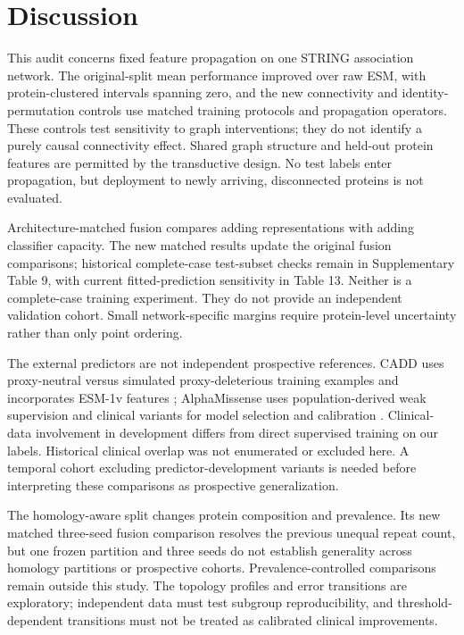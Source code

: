 \documentclass[conference]{IEEEtran}
\begin{document}
\section{Discussion}

This audit concerns fixed feature propagation on one STRING association network. The original-split mean performance improved over raw ESM, with protein-clustered intervals spanning zero, and the new connectivity and identity-permutation controls use matched training protocols and propagation operators. These controls test sensitivity to graph interventions; they do not identify a purely causal connectivity effect. Shared graph structure and held-out protein features are permitted by the transductive design. No test labels enter propagation, but deployment to newly arriving, disconnected proteins is not evaluated.

Architecture-matched fusion compares adding representations with adding classifier capacity. The new matched results update the original fusion comparisons; historical complete-case test-subset checks remain in Supplementary Table 9, with current fitted-prediction sensitivity in Table 13. Neither is a complete-case training experiment. They do not provide an independent validation cohort. Small network-specific margins require protein-level uncertainty rather than only point ordering.

The external predictors are not independent prospective references. CADD uses proxy-neutral versus simulated proxy-deleterious training examples and incorporates ESM-1v features \cite{Kircher2014CADD,Schubach2024CADDv17}; AlphaMissense uses population-derived weak supervision and clinical variants for model selection and calibration \cite{Cheng2023AlphaMissense}. Clinical-data involvement in development differs from direct supervised training on our labels. Historical clinical overlap was not enumerated or excluded here. A temporal cohort excluding predictor-development variants is needed before interpreting these comparisons as prospective generalization.

The homology-aware split changes protein composition and prevalence. Its new matched three-seed fusion comparison resolves the previous unequal repeat count, but one frozen partition and three seeds do not establish generality across homology partitions or prospective cohorts. Prevalence-controlled comparisons remain outside this study. The topology profiles and error transitions are exploratory; independent data must test subgroup reproducibility, and threshold-dependent transitions must not be treated as calibrated clinical improvements.
\end{document}
